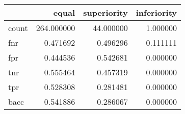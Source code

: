 \begin{tabular}{lrrr}
\toprule
{} &       equal &  superiority &  inferiority \\
\midrule
count &  264.000000 &    44.000000 &     1.000000 \\
fnr   &    0.471692 &     0.496296 &     0.111111 \\
fpr   &    0.444536 &     0.542681 &     0.000000 \\
tnr   &    0.555464 &     0.457319 &     0.000000 \\
tpr   &    0.528308 &     0.281481 &     0.000000 \\
bacc  &    0.541886 &     0.286067 &     0.000000 \\
\bottomrule
\end{tabular}
